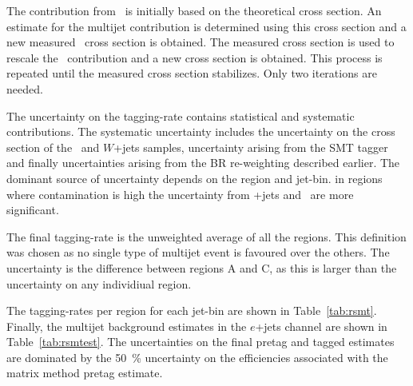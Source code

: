 The contribution from \ttbar\ is initially based on the theoretical cross section. An estimate for the multijet contribution is determined using this cross section and a new measured \ttbar\ cross section is obtained. The measured cross section is used to rescale the \ttbar\ contribution and a new cross section is obtained. This process is repeated until the measured cross section stabilizes. Only two iterations are needed.

The uncertainty on the tagging-rate contains statistical and systematic contributions. The systematic uncertainty includes the uncertainty on the cross section of the \ttbar\ and $W$+jets samples, uncertainty arising from the SMT tagger and finally uncertainties arising from the BR re-weighting described earlier. The dominant source of uncertainty depends on the region and jet-bin. in regions where contamination is high the uncertainty from \W+jets and \ttbar\ are more significant. 

The final tagging-rate is the unweighted average of all the regions. This definition was chosen as no single type of multijet event is favoured over the others. The uncertainty is the difference between regions A and C, as this is larger than the uncertainty on any individiual region. 

The tagging-rates per region for each jet-bin are shown in Table~\ref{tab:rsmt}. Finally, the multijet background estimates in the $e$+jets channel are shown in Table~\ref{tab:rsmtest}. The uncertainties on the final pretag and tagged estimates are dominated by the \SI{50}{\percent} uncertainty on the efficiencies associated with the matrix method pretag estimate.

